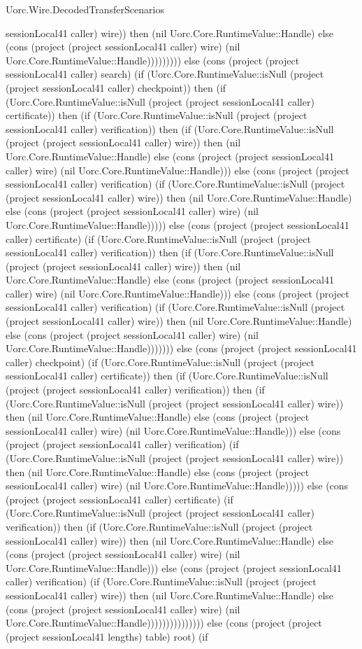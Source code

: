 \begin{lexlean}{Uorc.Wire.DecodedTransferScenarios}
\begin{semanticmodule}
{sessionLocal41 caller) wire)) then (nil Uorc.Core.RuntimeValue::Handle) else (cons (project (project sessionLocal41 caller) wire) (nil Uorc.Core.RuntimeValue::Handle))))))))) else (cons (project (project sessionLocal41 caller) search) (if (Uorc.Core.RuntimeValue::isNull (project (project sessionLocal41 caller) checkpoint)) then (if (Uorc.Core.RuntimeValue::isNull (project (project sessionLocal41 caller) certificate)) then (if (Uorc.Core.RuntimeValue::isNull (project (project sessionLocal41 caller) verification)) then (if (Uorc.Core.RuntimeValue::isNull (project (project sessionLocal41 caller) wire)) then (nil Uorc.Core.RuntimeValue::Handle) else (cons (project (project sessionLocal41 caller) wire) (nil Uorc.Core.RuntimeValue::Handle))) else (cons (project (project sessionLocal41 caller) verification) (if (Uorc.Core.RuntimeValue::isNull (project (project sessionLocal41 caller) wire)) then (nil Uorc.Core.RuntimeValue::Handle) else (cons (project (project sessionLocal41 caller) wire) (nil Uorc.Core.RuntimeValue::Handle))))) else (cons (project (project sessionLocal41 caller) certificate) (if (Uorc.Core.RuntimeValue::isNull (project (project sessionLocal41 caller) verification)) then (if (Uorc.Core.RuntimeValue::isNull (project (project sessionLocal41 caller) wire)) then (nil Uorc.Core.RuntimeValue::Handle) else (cons (project (project sessionLocal41 caller) wire) (nil Uorc.Core.RuntimeValue::Handle))) else (cons (project (project sessionLocal41 caller) verification) (if (Uorc.Core.RuntimeValue::isNull (project (project sessionLocal41 caller) wire)) then (nil Uorc.Core.RuntimeValue::Handle) else (cons (project (project sessionLocal41 caller) wire) (nil Uorc.Core.RuntimeValue::Handle))))))) else (cons (project (project sessionLocal41 caller) checkpoint) (if (Uorc.Core.RuntimeValue::isNull (project (project sessionLocal41 caller) certificate)) then (if (Uorc.Core.RuntimeValue::isNull (project (project sessionLocal41 caller) verification)) then (if (Uorc.Core.RuntimeValue::isNull (project (project sessionLocal41 caller) wire)) then (nil Uorc.Core.RuntimeValue::Handle) else (cons (project (project sessionLocal41 caller) wire) (nil Uorc.Core.RuntimeValue::Handle))) else (cons (project (project sessionLocal41 caller) verification) (if (Uorc.Core.RuntimeValue::isNull (project (project sessionLocal41 caller) wire)) then (nil Uorc.Core.RuntimeValue::Handle) else (cons (project (project sessionLocal41 caller) wire) (nil Uorc.Core.RuntimeValue::Handle))))) else (cons (project (project sessionLocal41 caller) certificate) (if (Uorc.Core.RuntimeValue::isNull (project (project sessionLocal41 caller) verification)) then (if (Uorc.Core.RuntimeValue::isNull (project (project sessionLocal41 caller) wire)) then (nil Uorc.Core.RuntimeValue::Handle) else (cons (project (project sessionLocal41 caller) wire) (nil Uorc.Core.RuntimeValue::Handle))) else (cons (project (project sessionLocal41 caller) verification) (if (Uorc.Core.RuntimeValue::isNull (project (project sessionLocal41 caller) wire)) then (nil Uorc.Core.RuntimeValue::Handle) else (cons (project (project sessionLocal41 caller) wire) (nil Uorc.Core.RuntimeValue::Handle))))))))))))))) else (cons (project (project (project sessionLocal41 lengths) table) root) (if }
\end{semanticmodule}
\end{lexlean}
